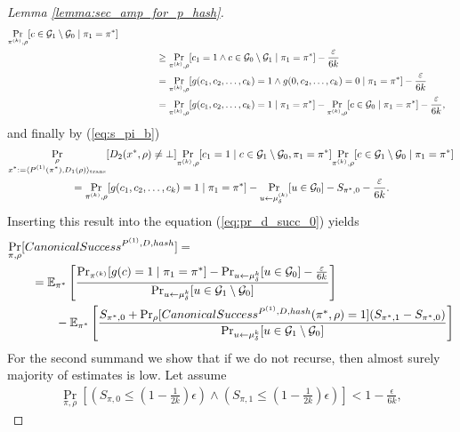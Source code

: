 \begin{proof}[Lemma \ref{lemma:sec_amp_for_p_hash}]
\begin{align*}
  \underset{\pi^{(k)}, \rho}{\Pr}[c \in \mathcal{G}_1 \setminus \mathcal{G}_0 \mid \pi_1 = \pi^*] \notag\\
  &\mbox\qquad\qquad \geq \underset{\pi^{(k)}, \rho}{\Pr}[c_1 = 1 \land c \in \mathcal{G}_0 \setminus \mathcal{G}_1 \mid \pi_1 = \pi^*] - \frac{\varepsilon}{6k} \\
  &\mbox\qquad\qquad = \underset{\pi^{(k)}, \rho}{\Pr}[g(c_1, c_2,\dots, c_k) = 1 \land g(0, c_2, \dots, c_k) = 0 \mid \pi_1 = \pi^*] - \frac{\varepsilon}{6k} \\
  &\mbox\qquad\qquad = \underset{\pi^{(k)}, \rho}{\Pr}[g(c_1, c_2,\dots, c_k) = 1 \mid \pi_1 = \pi^*] -  \underset{\pi^{(k)}, \rho}{\Pr}[c \in \mathcal{G}_0 \mid \pi_1 = \pi^*] - \frac{\varepsilon}{6k},
\end{align*}
and finally by (\ref{eq:s_pi_b})
\begin{align}
  &\underset{\substack{\rho \\ x^* := \langle P^{(1)}(\pi^*), D_1(\rho) \rangle_{\text{trans}}}}{\Pr}[D_2(x^*,\rho) \neq \bot]
  \underset{\pi^{(k)}, \rho}{\Pr}[c_1 = 1 \mid c \in \mathcal{G}_1 \setminus \mathcal{G}_0, \pi_1 = \pi^*]
  \underset{\pi^{(k)}, \rho}{\Pr}[c \in \mathcal{G}_1 \setminus \mathcal{G}_0 \mid \pi_1 = \pi^*] \notag\\
  &\mbox\qquad\qquad\qquad = \underset{\pi^{(k)}, \rho}{\Pr}[g(c_1, c_2,\dots, c_k) = 1 \mid \pi_1 = \pi^*] -  \underset{u \leftarrow \mu_{\delta}^{(k)}}{\Pr}[u \in \mathcal{G}_0]  - S_{\pi^*,0} - \frac{\varepsilon}{6k}.
\end{align}
Inserting this result into the equation (\ref{eq:pr_d_succ_0}) yields
\begin{align}
\label{eq:pr_d_succ_1}
  &\underset{\pi, \rho}{\Pr}[CanonicalSuccess^{P^{(1)}, D, hash}] = \notag\\
&\mbox\qquad = \mathbb{E}_{\pi^*}\left[\frac{{\Pr}_{\pi^{(k)}}[g(c) = 1 \mid \pi_1 = \pi^*]
- {\Pr}_{u \leftarrow \mu_{\delta}^{k}}[u \in \mathcal{G}_0] - \frac{\varepsilon}{6k}}
{\Pr_{u \leftarrow \mu_{\delta}^{k}}[u \in \mathcal{G}_1 \setminus \mathcal{G}_0]}\right] \notag\\
&\mbox\qquad\qquad - \mathbb{E}_{\pi^*}\left[\frac{S_{\pi^*,0} + \Pr_{\rho} [CanonicalSuccess^{P^{(1)}, D, hash}(\pi^*, \rho) = 1](S_{\pi^*,1} - S_{\pi^*,0})}
{{\Pr}_{u \leftarrow \mu_{\delta}^{k}}[u \in \mathcal{G}_1 \setminus \mathcal{G}_0]}\right]
\end{align}
For the second summand we show that if we do not recurse, then almost surely majority of estimates is low.
Let assume
\begin{align}
\underset{\pi, \rho}{\Pr}\left[\left(S_{\pi,0} \leq (1 - \frac{1}{2k})\epsilon\right) \land \left( S_{\pi,1} \leq (1-\frac{1}{2k})\epsilon\right)\right] < 1 - \frac{\epsilon}{6k},

\end{align}
\end{proof}
